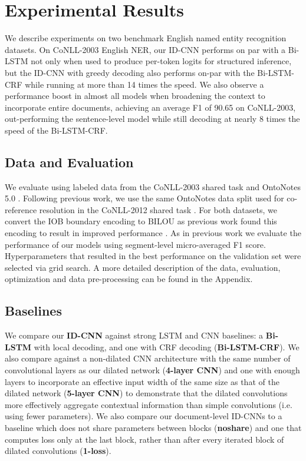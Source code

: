 \section{Experimental Results}

We describe experiments on two benchmark English named entity recognition datasets. On CoNLL-2003 English NER, our ID-CNN performs on par with a Bi-LSTM not only when used to produce per-token logits for structured inference, but the ID-CNN with greedy decoding also performs on-par with the Bi-LSTM-CRF while running at more than 14 times the speed. We also observe a performance boost in almost all models when broadening the context to incorporate entire documents, achieving an average F1 of 90.65 on CoNLL-2003, out-performing the sentence-level model while still decoding at nearly 8 times the speed of the Bi-LSTM-CRF.

\subsection{Data and Evaluation}
We evaluate using labeled data from the CoNLL-2003 shared task \citep{tjong2003introduction} and OntoNotes 5.0 \citep{hovy2006ontonotes,pradhan2013towards}. Following previous work, we use the same OntoNotes data split used for co-reference resolution in the CoNLL-2012 shared task \citep{pradhan2012conll}.
For both datasets, we convert the IOB boundary encoding to BILOU as previous work found this encoding to result in improved performance \citep{ratinov2009design}. As in previous work we evaluate the performance of our models using segment-level micro-averaged F1 score. Hyperparameters that resulted in the best performance on the validation set were selected via grid search. A more detailed description of the data, evaluation, optimization and data pre-processing can be found in the Appendix.

\subsection{Baselines \label{baselines-sec}}

We compare our {\bf ID-CNN} against strong LSTM and CNN baselines: a {\bf Bi-LSTM} with local decoding, and one with CRF decoding ({\bf Bi-LSTM-CRF}). We also compare against a non-dilated CNN architecture with the same number of convolutional layers as our dilated network ({\bf 4-layer CNN}) and one with enough layers to incorporate an effective input width of the same size as that of the dilated network ({\bf 5-layer CNN}) to demonstrate that the dilated convolutions more effectively aggregate contextual information than simple convolutions (i.e. using fewer parameters). We also compare our document-level ID-CNNs to a baseline which does not share parameters between blocks ({\bf noshare}) and one that computes loss only at the last block, rather than after every iterated block of dilated convolutions ({\bf 1-loss}).

